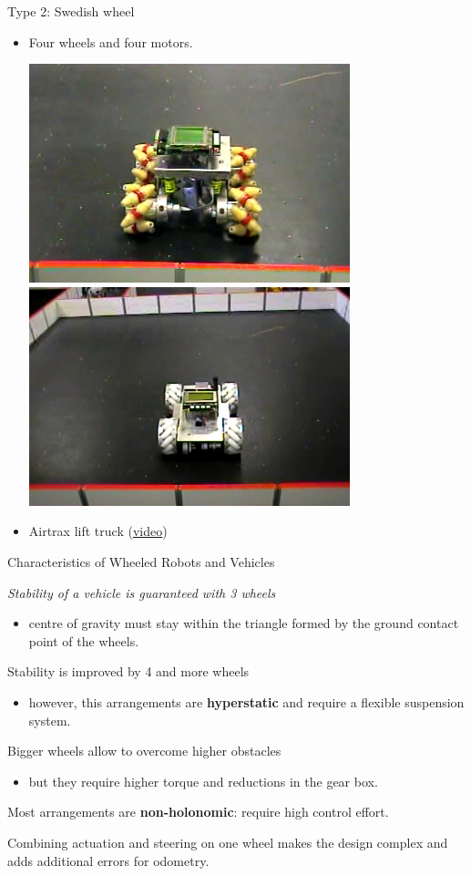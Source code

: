 \documentclass[compress]{beamer}
\begin{document}
\begin{frame}{Type 2: Swedish wheel}
{\begin{itemize}
    \item Four wheels and four motors.

        \begin{center}
            \includegraphics[width=0.45\linewidth]{swedishwheel3}
            \includegraphics[width=0.45\linewidth]{swedishwheel4}
        \end{center}

    \item Airtrax lift truck
  (\href{http://www.youtube.com/watch?v=IlmKcohyXG0}{video})
\end{itemize}

}
\end{frame}

\begin{frame}{Characteristics of Wheeled Robots and Vehicles}

\emph{Stability of a vehicle is guaranteed with 3 wheels}

\begin{itemize}
    \item centre of gravity must stay within the triangle formed by the ground
  contact point of the wheels.
\end{itemize}

Stability is improved by 4 and more wheels

\begin{itemize}
    \item however, this arrangements are \textbf{hyperstatic} and require a flexible
  suspension system.
\end{itemize}

\pause

Bigger wheels allow to overcome higher obstacles

\begin{itemize}
    \item but they require higher torque and reductions in the gear box.
\end{itemize}

\pause
Most arrangements are \textbf{non-holonomic}: require high control effort.

\pause
Combining actuation and steering on one wheel makes the design complex
and adds additional errors for odometry.

\end{frame}
\end{document}
